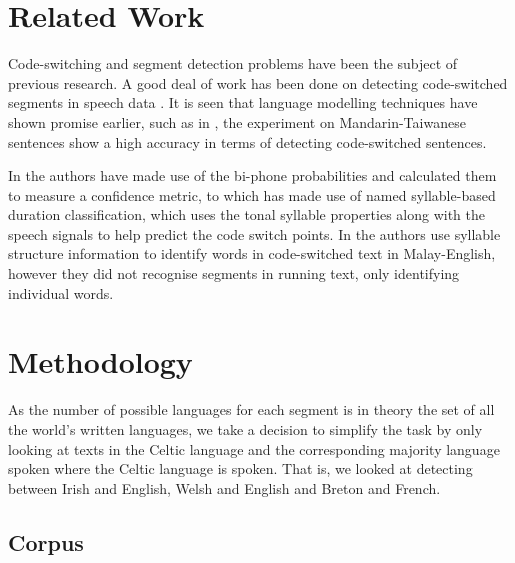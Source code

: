 \documentclass[11pt]{article}
\begin{document}
\section{Related Work}
\vspace{-0.132cm}
\label{sec:relwork}

Code-switching and segment detection problems have been the subject of previous research. A good deal of work
has been done on detecting code-switched segments in speech data \cite{chan2004detection,lyu2006language}.
It is seen that language modelling techniques have shown promise earlier, such as in , 
the experiment on Mandarin-Taiwanese sentences show a high accuracy in terms of detecting code-switched sentences. 

In  the authors have made use of the bi-phone probabilities and calculated them to measure a confidence metric, 
to \cite{lyu2006language} which has made use of named syllable-based duration classification, 
which uses the tonal syllable properties along with the speech signals to help predict the code switch points. In  
 the authors use syllable structure information to identify words in code-switched text in Malay-English, however they did not 
recognise segments in running text, only identifying individual words.


\section{Methodology}
\vspace{-0.132cm}
\label{sec:method}

As the number of possible languages for each segment is in theory the set of all the world's written languages, we take 
a decision to simplify the task by only looking at texts in the Celtic language and the corresponding majority language spoken
where the Celtic language is spoken. That is, we looked at detecting between Irish and English, Welsh and English 
and Breton and French.

\subsection{Corpus}
\vspace{-0.152cm}
\end{document}
